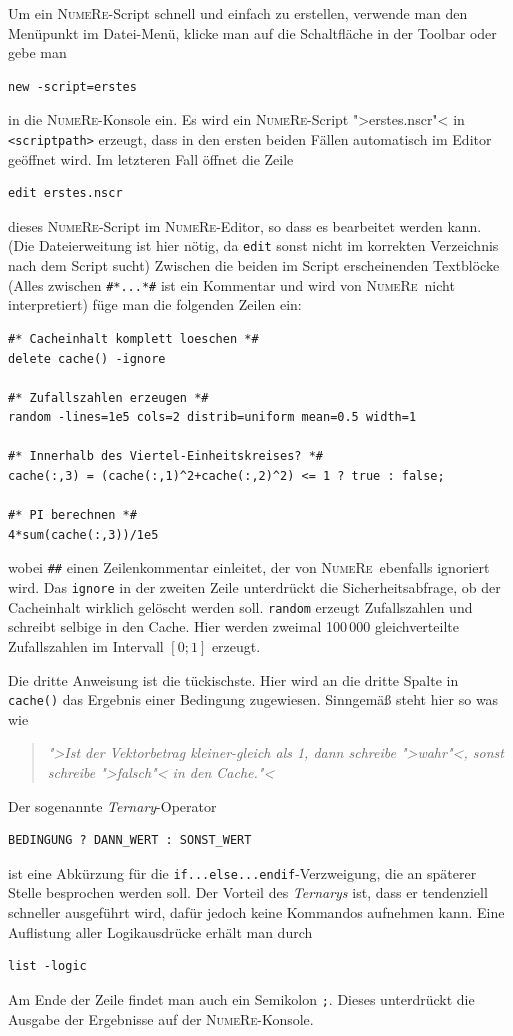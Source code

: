 \documentclass[DIV=14,headsepline,footsepline]{scrbook}
\newcommand{\NR}{\textsc{Nu\-me\-Re}}
\begin{document}
				Um ein \NR-Script schnell und einfach zu erstellen, verwende man den Menüpunkt im Datei-Menü, klicke man auf die Schaltfläche in der Toolbar oder gebe man 
				\begin{lstlisting}
new -script=erstes
				\end{lstlisting}
				in die \NR-Konsole ein. Es wird ein \NR-Script ">erstes.nscr"< in \verb+<scriptpath>+ erzeugt, dass in den ersten beiden Fällen automatisch im Editor geöffnet wird. Im letzteren Fall öffnet die Zeile
				\begin{lstlisting}
edit erstes.nscr
				\end{lstlisting}
				dieses \NR-Script im \NR-Editor, so dass es bearbeitet werden kann. (Die Dateierweitung ist hier nötig, da \verb+edit+ sonst nicht im korrekten Verzeichnis nach dem Script sucht) Zwischen die beiden im Script erscheinenden Textblöcke (Alles zwischen \verb+#*...*#+ ist ein Kommentar und wird von \NR\ nicht interpretiert) füge man die folgenden Zeilen ein:
				\begin{lstlisting}
#* Cacheinhalt komplett loeschen *#
delete cache() -ignore

#* Zufallszahlen erzeugen *#
random -lines=1e5 cols=2 distrib=uniform mean=0.5 width=1

#* Innerhalb des Viertel-Einheitskreises? *#
cache(:,3) = (cache(:,1)^2+cache(:,2)^2) <= 1 ? true : false;

#* PI berechnen *#
4*sum(cache(:,3))/1e5
				\end{lstlisting}
				wobei \verb+##+ einen Zeilenkommentar einleitet, der von \NR\ ebenfalls ignoriert wird. Das \verb+ignore+ in der zweiten Zeile unterdrückt die Sicherheitsabfrage, ob der Cacheinhalt wirklich gelöscht werden soll. \verb+random+ erzeugt Zufallszahlen und schreibt selbige in den Cache. Hier werden zweimal 100\,000 gleichverteilte Zufallszahlen im Intervall $[0;1]$ erzeugt.
				
				Die dritte Anweisung ist die tückischste. Hier wird an die dritte Spalte in \verb+cache()+ das Ergebnis einer Bedingung zugewiesen. Sinngemäß steht hier so was wie
				\begin{quotation}
					\noindent\emph{">Ist der Vektorbetrag kleiner-gleich als 1, dann schreibe ">wahr"<, sonst schreibe ">falsch"< in den Cache."<}
				\end{quotation}
				Der sogenannte \emph{Ternary}-Operator
				\begin{lstlisting}
BEDINGUNG ? DANN_WERT : SONST_WERT
				\end{lstlisting}
				ist eine Abkürzung für die \verb+if...else...endif+-Verzweigung, die an späterer Stelle besprochen werden soll. Der Vorteil des \emph{Ternarys} ist, dass er tendenziell schneller ausgeführt wird, dafür jedoch keine Kommandos aufnehmen kann. Eine Auflistung aller Logikausdrücke erhält man durch
				\begin{lstlisting}
list -logic
				\end{lstlisting}
				Am Ende der Zeile findet man auch ein Semikolon \verb+;+. Dieses unterdrückt die Ausgabe der Ergebnisse auf der \NR-Konsole.
				
\end{document}
